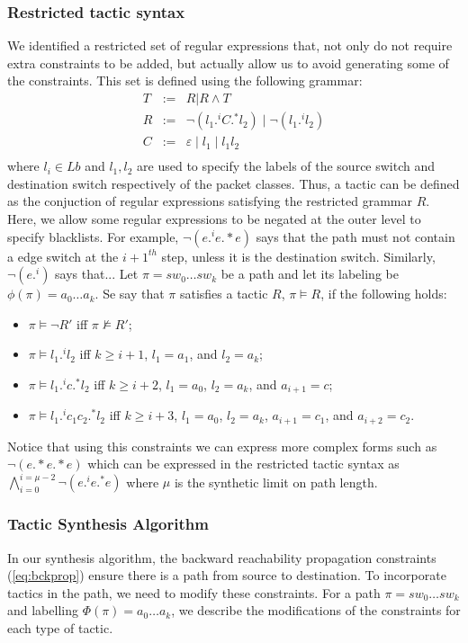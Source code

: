\subsubsection{Restricted tactic syntax}
We identified a restricted set of regular expressions that, not only do not require extra constraints to be added,
but actually allow us to avoid generating some of the constraints. 
This set is defined using the following grammar:
$$\begin{array}{rcl}
T  &  := & R | R \wedge T \\
R  &  :=  &  \neg (l_1 .^i C .^* l_2) \mid \neg (l_1 .^i l_2)\\ 
C  &  :=  &  \varepsilon \mid l_1 \mid l_1 l_2\\
\end{array}$$
where $l_i\in Lb$ and $l_1, l_2$ are used to specify the labels of the source switch and destination switch respectively of the packet classes. Thus, a tactic can be defined as the conjuction of regular expressions satisfying the restricted grammar $R$. 
Here, we allow some regular expressions to be negated at the outer level to specify blacklists. For example, $\neg (e .^i e .* e)$ says that the path must not contain a edge switch at the $i+1^{th}$ step, unless it is the destination switch. 
Similarly, $\neg (e .^i)$ says that...
Let $\pi = sw_0\ldots sw_k$ be a path and 
let its labeling be $\phi(\pi)= a_0\ldots a_k$.
Se say that $\pi$ satisfies a tactic $R$, $\pi\vDash R$, if the following
holds:
\begin{itemize}
\item $\pi \vDash \neg R'$ iff $\pi \not\vDash R'$;
\item $\pi \vDash  l_1 .^i l_2$ iff $k\geq i+1$, $l_1= a_1$, and $l_2= a_k$; 
\item $\pi \vDash  l_1 .^i c.^* l_2$ iff $k\geq i+2$, $l_1= a_0$, $l_2= a_k$, and $a_{i+1}=c$;
\item $\pi \vDash  l_1 .^i c_1 c_2.^* l_2$ iff $k\geq i+3$, $l_1= a_0$, $l_2= a_k$, $a_{i+1}=c_1$, and $a_{i+2}=c_2$.
\end{itemize}

Notice that using this constraints we can express more complex forms such as
$\neg (e .* e .* e)$ which can be expressed in the restricted tactic syntax as $\bigwedge \limits_{i=0}^{i=\mu-2} \neg (e .^i e .^* e)$ where $\mu$ is the synthetic limit on path length.

\subsubsection{Tactic Synthesis Algorithm}
In our synthesis algorithm, the backward reachability propagation constraints (\cref{eq:bckprop}) ensure there is a path from source to destination. To incorporate tactics in the path, we need to modify these constraints. For a path $\pi = sw_0 \ldots sw_k$ and labelling $\Phi(\pi) = a_0 \ldots a_k$, we describe the modifications of the constraints for each type of tactic.

